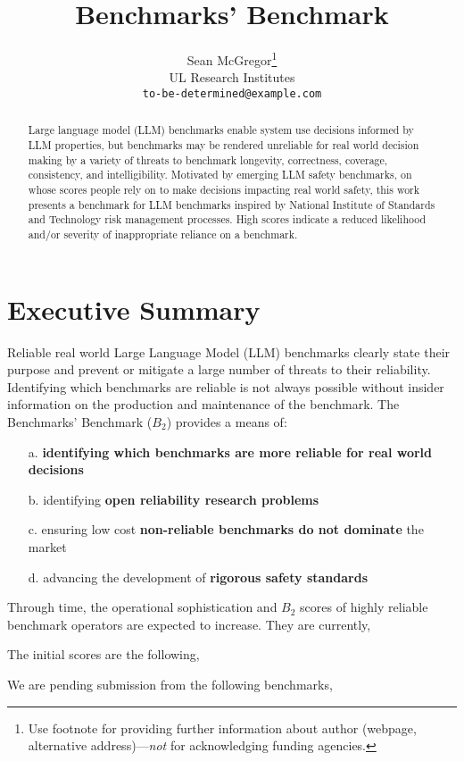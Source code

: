 \documentclass{article}
\title{Benchmarks' Benchmark}
\author{%
  Sean McGregor\thanks{Use footnote for providing further information
    about author (webpage, alternative address)---\emph{not} for acknowledging
    funding agencies.} \\
  UL Research Institutes\\
  \texttt{to-be-determined@example.com} \\
}
\begin{document}
\maketitle


\begin{abstract}
Large language model (LLM) benchmarks enable system use decisions informed by LLM properties, but benchmarks may be rendered unreliable for real world decision making by a variety of threats to benchmark longevity, correctness, coverage, consistency, and intelligibility. Motivated by emerging LLM safety benchmarks, on whose scores people rely on to make decisions impacting real world safety, this work presents a benchmark for LLM benchmarks inspired by National Institute of Standards and Technology risk management processes. High scores indicate a reduced likelihood and/or severity of inappropriate reliance on a benchmark.
\end{abstract}


\section{Executive Summary}

Reliable real world Large Language Model (LLM) benchmarks clearly state their purpose and prevent or mitigate a large number of threats to their reliability. Identifying which benchmarks are reliable is not always possible without insider information on the production and maintenance of the benchmark. The Benchmarks' Benchmark (\(B_{2}\)) provides a means of:

\begin{itemize}
    \item[a.] {\bf identifying which benchmarks are more reliable for real world decisions}
    \item[b.] identifying {\bf open reliability research problems}
    \item[c.] ensuring low cost {\bf non-reliable benchmarks do not dominate} the market
    \item[d.] advancing the development of {\bf rigorous safety standards}
\end{itemize}

Through time, the operational sophistication and \(B_2\) scores of highly reliable benchmark operators are expected to increase. They are currently,

The initial scores are the following,

We are pending submission from the following benchmarks,
\end{document}
